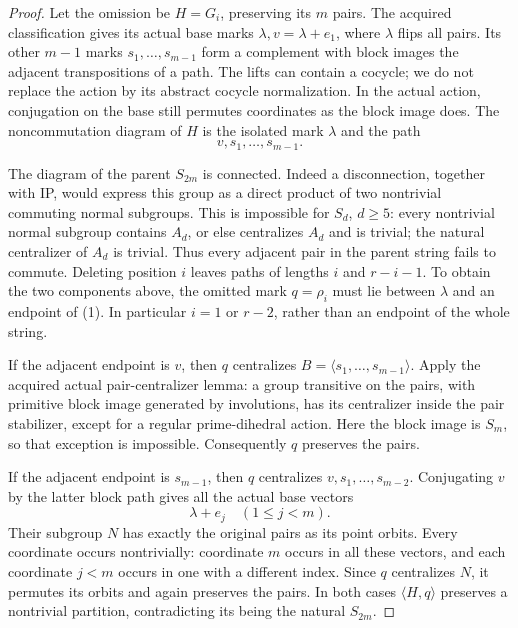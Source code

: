 \documentclass[11pt,a4paper]{article}
\newcommand{\gen}[1]{\langle#1\rangle}
\begin{document}
\begin{proof}
Let the omission be $H=G_i$, preserving its $m$ pairs. The acquired
classification gives its actual base marks
$\lambda, v=\lambda+e_1$, where $\lambda$ flips all pairs.
Its other $m-1$ marks $s_1,\ldots,s_{m-1}$ form a complement
with block images the adjacent transpositions of a path.
The lifts can contain a cocycle; we do not replace the action
by its abstract cocycle normalization. In the actual action,
conjugation on the base still permutes coordinates as the
block image does. The noncommutation diagram of $H$ is the
isolated mark $\lambda$ and the path
\[
                        v,s_1,\ldots,s_{m-1}.                 \tag{1}
\]

The diagram of the parent $S_{2m}$ is connected. Indeed a
disconnection, together with IP, would express this group as a
direct product of two nontrivial commuting normal subgroups.
This is impossible for $S_d$, $d\ge5$: every nontrivial normal
subgroup contains $A_d$, or else centralizes $A_d$ and is trivial;
the natural centralizer of $A_d$ is trivial. Thus every adjacent
pair in the parent string fails to commute. Deleting position
$i$ leaves paths of lengths $i$ and $r-i-1$. To obtain the two
components above, the omitted mark $q=\rho_i$ must lie between
$\lambda$ and an endpoint of (1). In particular $i=1$ or
$r-2$, rather than an endpoint of the whole string.

If the adjacent endpoint is $v$, then $q$ centralizes
$B=\gen{s_1,\ldots,s_{m-1}}$. Apply the acquired actual
pair-centralizer lemma: a group transitive on the pairs, with
primitive block image generated by involutions, has its
centralizer inside the pair stabilizer, except for a regular
prime-dihedral action. Here the block image is $S_m$, so that
exception is impossible. Consequently $q$ preserves the pairs.

If the adjacent endpoint is $s_{m-1}$, then $q$ centralizes
$v,s_1,\ldots,s_{m-2}$. Conjugating $v$ by the latter block
path gives all the actual base vectors
\[
                         \lambda+e_j\quad(1\le j<m).
\]
Their subgroup $N$ has exactly the original pairs as its point
orbits. Every coordinate occurs nontrivially: coordinate $m$
occurs in all these vectors, and each coordinate $j<m$ occurs
in one with a different index. Since $q$ centralizes $N$, it
permutes its orbits and again preserves the pairs. In both
cases $\gen{H,q}$ preserves a nontrivial partition, contradicting
its being the natural $S_{2m}$.
\end{proof}
\end{document}
